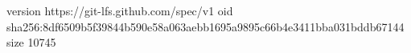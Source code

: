 version https://git-lfs.github.com/spec/v1
oid sha256:8df6509b5f39844b590e58a063aebb1695a9895c66b4e3411bba031bddb67144
size 10745
